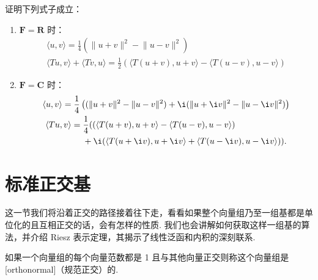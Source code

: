 \begin{example}
    证明下列式子成立：
    \begin{enumerate}
        \item $\mathbf{F} = \mathbf{R}$ 时：
              \begin{gather}
                  \label{eq:23:内积和范数的性质1}
                  \langle u, v\rangle = \frac{1}{4}\left( \lVert u + v \rVert^2 - \lVert u - v \rVert^2\right) \\
                  \label{eq:23:内积和范数的性质2}
                  \langle Tu, v\rangle + \langle Tv, u\rangle = \frac{1}{2}\left(\langle T(u + v), u + v\rangle - \langle T(u - v), u - v\rangle\right)
              \end{gather}

        \item $\mathbf{F} = \mathbf{C}$ 时：
              \begin{gather}
                  \label{eq:23:内积和范数的性质3}
                  \langle u, v\rangle = \frac{1}{4}\left((\lVert u + v \rVert^2 - \lVert u - v \rVert^2) + \i(\lVert u + \i v \rVert^2 - \lVert u - \i v \rVert^2)\right) \\
                  \label{eq:23:内积和范数的性质4}
                  \begin{aligned}
                      \langle Tu, v\rangle ={} & \frac{1}{4}  ((\langle T(u + v), u + v\rangle - \langle T(u - v), u - v\rangle)     \\
                                               & + \i(\langle T(u + \i v), u + \i v\rangle + \langle T(u - \i v), u - \i v\rangle)).
                  \end{aligned}
              \end{gather}
    \end{enumerate}

\end{example}

\section{标准正交基}

这一节我们将沿着正交的路径接着往下走，看看如果整个向量组乃至一组基都是单位化的且互相正交的话，会有怎样的性质. 我们也会讲解如何获取这样一组基的算法，并介绍 Riesz 表示定理，其揭示了线性泛函和内积的深刻联系.

\begin{definition}
    如果一个向量组的每个向量范数都是 1 且与其他向量正交则称这个向量组是[orthonormal]（规范正交）的.
\end{definition}

